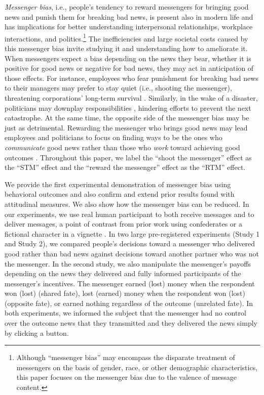 \emph{Messenger bias}, i.e., people's tendency to reward messengers for
bringing good news and punish them for breaking bad news, is present
also in modern life and has implications for better understanding
interpersonal relationships, workplace interactions, and
politics.\footnote{Although ``messenger bias'' may encompass the
  disparate treatment of messengers on the basis of gender, race, or
  other demographic characteristics, this paper focuses on the messenger
  bias due to the valence of message content.} The inefficiencies and
large societal costs caused by this messenger bias invite studying it
and understanding how to ameliorate it. When messengers expect a bias
depending on the news they bear, whether it is positive for good news or
negative for bad news, they may act in anticipation of those effects.
For instance, employees who fear punishment for breaking bad news to
their managers may prefer to stay quiet (i.e., shooting the messenger),
threatening corporations' long-term survival \citep{charan2002companies}.
Similarly, in the wake of a disaster, politicians may downplay
responsibilities \citep{liu2020framing}, hindering efforts to prevent the
next catastrophe. At the same time, the opposite side of the messenger
bias may be just as detrimental. Rewarding the messenger who brings good
news may lead employees and politicians to focus on finding ways to be
the ones who \emph{communicate} good news rather than those who
\emph{work} toward achieving good outcomes \citep[see, e.g.,][]{grimmer2014impression}.
Throughout this paper, we label the ``shoot the
messenger'' effect as the ``STM'' effect and the ``reward the
messenger'' effect as the ``RTM'' effect.

We provide the first experimental demonstration of messenger bias using
behavioral outcomes and also confirm and extend prior results found with
attitudinal measures. We also show how the messenger bias
can be reduced. In our experiments, we use real human participant to
both receive messages and to deliver messages, a point of contrast from
prior work using confederates or a fictional character in a vignette \citep{kuhlen2013language}. In two large pre-registered experiments (Study 1 and Study 2), we compared
people's decisions toward a messenger who delivered good rather than bad
news against decisions toward another partner who was not the messenger. In
the second study, we also manipulate the messenger's payoffs depending
on the news they delivered and fully informed participants of the
messenger's incentives. The messenger earned (lost) money when the
respondent won (lost) (shared fate), lost (earned) money when the respondent
won (lost) (opposite fate), or earned nothing regardless of the outcome
(unrelated fate). In both experiments, we informed the subject that the
messenger had no control over the outcome news that they transmitted and
they delivered the news simply by clicking a button.

